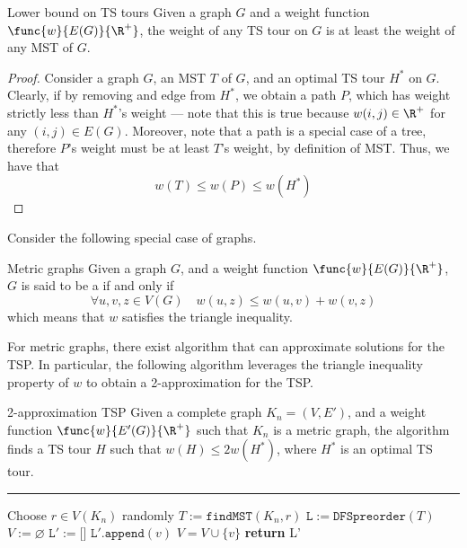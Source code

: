 \documentclass[a4paper, 12pt]{report}
\begin{document}
    \begin{framedlem}[label={tsp bound}]{Lower bound on TS tours}
        Given a graph $G$ and a weight function $\func{w}{E(G)}{\R^+}$, the weight of any TS tour on $G$ is at least the weight of any MST of $G$.
    \end{framedlem}

    \begin{proof}
        Consider a graph $G$, an MST $T$ of $G$, and an optimal TS tour $H^*$ on $G$. Clearly, if by removing and edge from $H^*$, we obtain a path $P$, which has weight strictly less than $H^*$'s weight --- note that this is true because $w(i, j) \in \R^+$ for any $(i, j) \in E(G)$. Moreover, note that a path is a special case of a tree, therefore $P$'s weight must be at least $T$'s weight, by definition of MST. Thus, we have that $$w(T) \le w(P) \le w(H^*)$$
    \end{proof}

    Consider the following special case of graphs.

    \begin{frameddefn}{Metric graphs}
        Given a graph $G$, and a weight function $\func{w}{E(G)}{\R^+}$, $G$ is said to be a  if and only if $$\forall u, v, z \in V(G) \quad w(u, z) \le w(u, v) + w(v, z)$$ which means that $w$ satisfies the triangle inequality.
    \end{frameddefn}

    For metric graphs, there exist algorithm that can approximate solutions for the TSP. In particular, the following algorithm leverages the triangle inequality property of $w$ to obtain a 2-approximation for the TSP.

    \begin{framedalgo}{2-approximation TSP}
        Given a complete graph $K_n = (V, E')$, and a weight function $\func{w}{E'(G)}{\R^+}$ such that $K_n$ is a metric graph, the algorithm finds a TS tour $H$ such that $w(H) \le 2w(H^*)$, where $H^*$ is an optimal TS tour. \\
        \hrule

        \quad
        \label{alg:2-approx_tsp}
        \begin{algorithmic}[1]
                \State Choose $r \in V(K_n)$ randomly
                \State $T := \texttt{findMST}(K_n, r)$ 
                \State $\texttt L := \texttt{DFSpreorder}(T)$ 
                \State $V := \varnothing$
                \State $\texttt L' := \texttt{[]}$
                        \State $\texttt L'.\texttt{append}(v)$
                        \State $V = V \cup \{v\}$
                    \EndIf
                \EndFor
                \State \textbf{return} \ttt L' 
            \EndFunction
        \end{algorithmic}
    \end{framedalgo}
\end{document}
